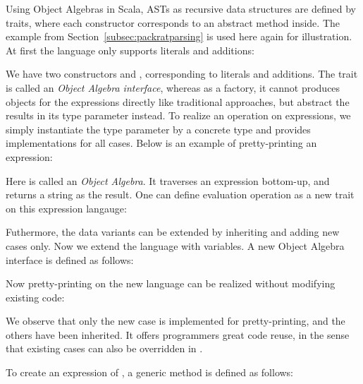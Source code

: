 Using Object Algebras in Scala, ASTs as recursive data structures are defined by traits, where each constructor corresponds to an abstract method inside. The example from Section~\ref{subsec:packratparsing} is used here again for illustration.
At first the language only supports literals and additions:

We have two constructors  and , corresponding to literals and additions. The trait  is called an \textit{Object Algebra interface},
whereas as a factory, it cannot produces objects for the expressions directly like traditional approaches, but abstract the results in its
type parameter  instead. To realize an operation on expressions, we simply instantiate the type parameter by a concrete type and
provides implementations for all cases. Below is an example of pretty-printing an expression:

Here  is called an \textit{Object Algebra}. It traverses an expression bottom-up, and returns a string as the result.
One can define evaluation operation as a new trait on this expression langauge:


Futhermore, the data variants can be extended by inheriting  and adding new cases only. Now we extend the language
with variables. A new Object Algebra interface  is defined as follows:

Now pretty-printing on the new language can be realized without modifying existing code:

We observe that only the new case is implemented for pretty-printing, and the others have been inherited.
It offers programmers great code reuse, in the sense that existing cases can also be
overridden in .

To create an expression of , a generic method is defined as follows:

